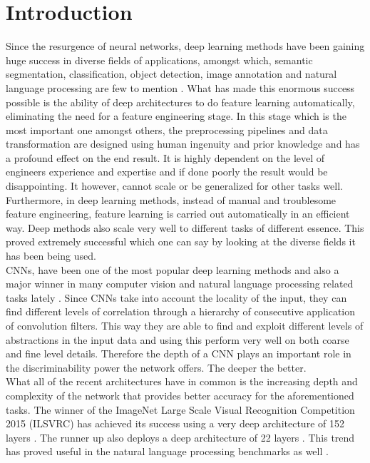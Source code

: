 \documentclass{article} \usepackage{lets_keepit_simple,times}
\begin{document}
\section{Introduction}
Since the resurgence of neural networks, deep learning methods have been gaining huge success in diverse fields of applications, amongst which, semantic segmentation, classification, object detection, image annotation and natural language processing are few to mention \cite{Guo_deep_learning_review_2015}.
What has made this enormous success possible is the ability of deep architectures to do feature learning automatically, eliminating the need for a feature engineering stage. In this stage which is the most important one amongst others, the preprocessing pipelines and data transformation are designed using human ingenuity and prior knowledge \cite{bengio_representation_2013} and has a profound effect on the end result. It is highly dependent on the level of engineers experience and expertise and if done poorly the result would be disappointing. It however, cannot scale or be generalized for other tasks well. Furthermore, in deep learning methods, instead of manual and troublesome feature engineering,  feature learning is carried out automatically in an efficient way. Deep methods also scale very well to different tasks of different essence. This proved extremely successful which one can say by looking at the diverse fields it has been being used.\\
CNNs, have been one of the most popular deep learning methods and also a major winner in many computer vision and natural language processing related tasks lately \cite{Simonyan_VGG_2014,Szegedy_googlenet_2015,He_ResNet_2015}. Since CNNs take into account the locality of the input, they can find different levels of correlation through a hierarchy of consecutive application of convolution filters. This way they are able to find and exploit different levels of abstractions in the input data and using this perform very well on both coarse and fine level details. Therefore the depth of a CNN plays an important role in the discriminability power the network offers. The deeper the better.\\
What all of the recent architectures have in common is the increasing depth and complexity of the network that provides better accuracy for the aforementioned tasks. The winner of the ImageNet Large Scale Visual Recognition Competition 2015 (ILSVRC) \cite{Russakovsky_ImageNet_2015} has achieved its success using a very deep architecture of 152 layers \cite{He_ResNet_2015}. The runner up also deploys a deep architecture of 22 layers \cite{Szegedy_googlenet_2015}. This trend has proved useful in the natural language processing benchmarks as well \cite{Sercu_VeryDeepMulti_2015}.\\
\end{document}
